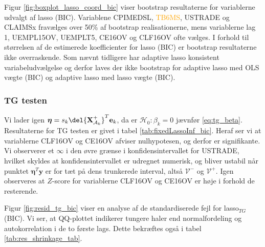Figur \ref{fig:boxplot_lasso_coord_bic} viser bootstrap resultaterne for variablerne udvalgt af lasso (BIC).
Variablene \textcolor{cadetblue2}{CPIMEDSL}, \textcolor{orange}{TB6MS}, \textcolor{blue3}{USTRADE} og \textcolor{blue3}{CLAIMSx} fravælges over 50\% af bootstrap realisationerne, mens variablerne \textcolor{blue3}{lag 1}, \textcolor{blue3}{UEMPL15OV}, \textcolor{blue3}{UEMPLT5}, \textcolor{blue3}{CE16OV} og \textcolor{blue3}{CLF16OV} ofte vælges.
I forhold til størrelsen af de estimerede koefficienter for lasso (BIC) er bootstrap resultaterne ikke overraskende. 
Som nævnt tidligere har adaptive lasso konsistent variabeludvælgelse og derfor laves der ikke bootstrap for adaptive lasso med OLS vægte (BIC) og adaptive lasso med lasso vægte (BIC). 

\subsubsection{TG testen}
Vi lader igen $\boldsymbol{\eta} = s_k \del{\textbf{X}^+_{\mathcal{A}_k}}^T \mathbf{e}_k$, da er $\mathcal{H}_0: \beta_k = 0$ jævnfør \eqref{eq:tg_beta}. 
Resultaterne for TG testen er givet i tabel \ref{tab:fixedLassoInf_bic}.
Heraf ser vi at variablerne \textcolor{blue3}{CLF16OV} og \textcolor{blue3}{CE16OV} afviser nulhypotesen, og derfor er signifikante.
Vi observerer et $\infty$ i den øvre grænse i konfidensintervallet for \textcolor{blue3}{USTRADE}, hvilket skyldes at konfidensintervallet er udregnet numerisk, og bliver ustabil når punktet $\boldsymbol\eta^T \mathbf{y}$ er for tæt på dens trunkerede interval, altså $\mathcal{V}^-$ og $\mathcal{V}^+$. 
Igen observeres at $Z$-score for variablerne \textcolor{blue3}{CLF16OV} og \textcolor{blue3}{CE16OV} er høje i forhold de resterende. 

Figur \ref{fig:resid_tg_bic} viser en analyse af de standardiserede fejl for lasso$_{TG}$ (BIC). Vi ser, at QQ-plottet indikerer tungere haler end normalfordeling og autokorrelation i de to første lags. 
Dette bekræftes også i tabel \ref{tab:res_shrinkage_tab}.




